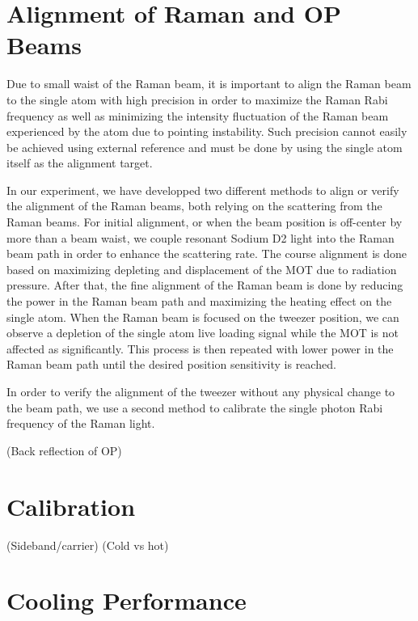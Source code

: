 \section{Alignment of Raman and OP Beams}

Due to small waist of the Raman beam, it is important to align the Raman beam to
the single atom with high precision in order to maximize the Raman Rabi frequency
as well as minimizing the intensity fluctuation of the Raman beam experienced by the atom
due to pointing instability.
Such precision cannot easily be achieved using external reference and
must be done by using the single atom itself as the alignment target.

In our experiment, we have developped two different methods to align or verify the alignment
of the Raman beams, both relying on the scattering from the Raman beams.
For initial alignment, or when the beam position is off-center
by more than a beam waist, we couple resonant Sodium D2 light into the Raman beam path
in order to enhance the scattering rate. The course alignment is done based on
maximizing depleting and displacement of the MOT due to radiation pressure.
After that, the fine alignment of the Raman beam is done by reducing the power in the Raman
beam path and maximizing the heating effect on the single atom.
When the Raman beam is focused on the tweezer position,
we can observe a depletion of the single atom live loading signal
while the MOT is not affected as significantly.
This process is then repeated with lower power in the Raman beam path until the desired
position sensitivity is reached.

In order to verify the alignment of the tweezer without any physical change to the beam path,
we use a second method to calibrate the single photon Rabi frequency of the Raman light.

(Back reflection of OP)

\section{Calibration}

(Sideband/carrier)
(Cold vs hot)

\section{Cooling Performance}

